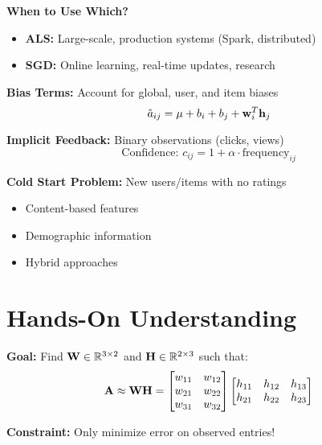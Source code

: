 \documentclass{beamer}
\begin{document}
\begin{frame}\textbf{When to Use Which?}
\begin{itemize}
\item \textbf{ALS:} Large-scale, production systems (Spark, distributed)
    \pause
\item \textbf{SGD:} Online learning, real-time updates, research
\end{itemize}
\end{frame}

\begin{frame}\textbf{Bias Terms:} Account for global, user, and item biases
\begin{equation*}
\hat{a}_{ij} = \mu + b_i + b_j + \mathbf{w}_i^T \mathbf{h}_j
\end{equation*}

\pause
\textbf{Implicit Feedback:} Binary observations (clicks, views)
\begin{equation*}
\text{Confidence: } c_{ij} = 1 + \alpha \cdot \text{frequency}_{ij}
\end{equation*}

\pause
\textbf{Cold Start Problem:} New users/items with no ratings
\begin{itemize}
\item Content-based features
    \item Demographic information  
    \pause
\item Hybrid approaches
\end{itemize}
\end{frame}

\section{Hands-On Understanding}

\begin{frame}\textbf{Goal:} Find $\mathbf{W} \in \mathbb{R}^{3 \times 2}$ and $\mathbf{H} \in \mathbb{R}^{2 \times 3}$ such that:
\begin{equation*}
\mathbf{A} \approx \mathbf{W} \mathbf{H} = \begin{bmatrix}
w_{11} & w_{12} \\
w_{21} & w_{22} \\
w_{31} & w_{32}
\end{bmatrix}
\begin{bmatrix}
h_{11} & h_{12} & h_{13} \\
h_{21} & h_{22} & h_{23}
\end{bmatrix}
\end{equation*}

\pause
\textbf{Constraint:} Only minimize error on observed entries!
\end{frame}
\end{document}
